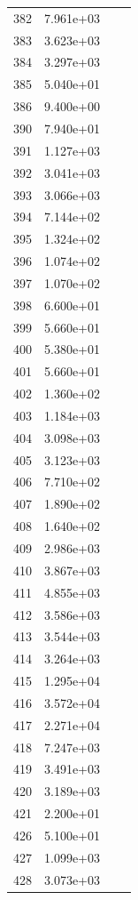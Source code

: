 \documentclass[12pt]{article}
\begin{document}
\begin{longtable}{@{}cccc@{}}
382 & 7.961e+03 &  &  \\
383 & 3.623e+03 &  &  \\
384 & 3.297e+03 &  &  \\
385 & 5.040e+01 &  &  \\
386 & 9.400e+00 &  &  \\
390 & 7.940e+01 &  &  \\
391 & 1.127e+03 &  &  \\
392 & 3.041e+03 &  &  \\
393 & 3.066e+03 &  &  \\
394 & 7.144e+02 &  &  \\
395 & 1.324e+02 &  &  \\
396 & 1.074e+02 &  &  \\
397 & 1.070e+02 &  &  \\
398 & 6.600e+01 &  &  \\
399 & 5.660e+01 &  &  \\
400 & 5.380e+01 &  &  \\
401 & 5.660e+01 &  &  \\
402 & 1.360e+02 &  &  \\
403 & 1.184e+03 &  &  \\
404 & 3.098e+03 &  &  \\
405 & 3.123e+03 &  &  \\
406 & 7.710e+02 &  &  \\
407 & 1.890e+02 &  &  \\
408 & 1.640e+02 &  &  \\
409 & 2.986e+03 &  &  \\
410 & 3.867e+03 &  &  \\
411 & 4.855e+03 &  &  \\
412 & 3.586e+03 &  &  \\
413 & 3.544e+03 &  &  \\
414 & 3.264e+03 &  &  \\
415 & 1.295e+04 &  &  \\
416 & 3.572e+04 &  &  \\
417 & 2.271e+04 &  &  \\
418 & 7.247e+03 &  &  \\
419 & 3.491e+03 &  &  \\
420 & 3.189e+03 &  &  \\
421 & 2.200e+01 &  &  \\
426 & 5.100e+01 &  &  \\
427 & 1.099e+03 &  &  \\
428 & 3.073e+03 &  &  \\

\end{longtable}
\end{document}
